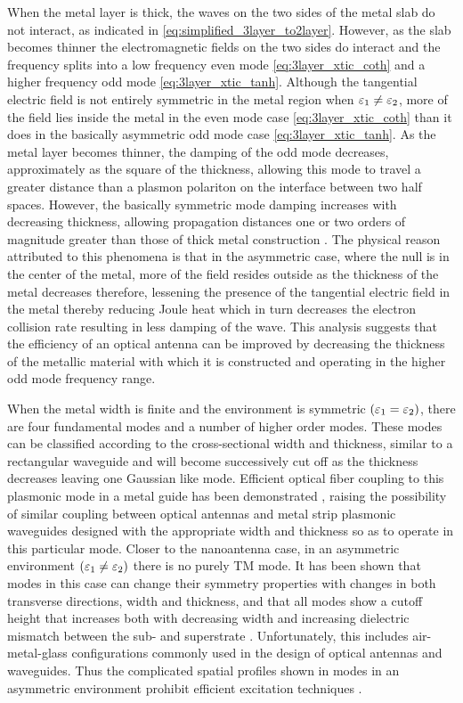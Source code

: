 When the metal layer is thick, the waves on the two sides of the metal slab do not interact, as indicated in \eqref{eq:simplified_3layer_to2layer}. However, as the slab becomes thinner the electromagnetic fields on the two sides do interact and the frequency splits into a low frequency even mode \eqref{eq:3layer_xtic_coth} and a higher frequency odd mode \eqref{eq:3layer_xtic_tanh}. Although the tangential electric field is not entirely symmetric in the metal region when $\varepsilon_1 \ne \varepsilon_2$, more of the field lies inside the metal in the even mode case \eqref{eq:3layer_xtic_coth} than it does in the basically asymmetric odd mode case \eqref{eq:3layer_xtic_tanh}. As the metal layer becomes thinner, the damping of the odd mode decreases, approximately as the square of the thickness, allowing this mode to travel a greater distance than a plasmon polariton on the interface between two half spaces. However, the basically symmetric mode damping increases with decreasing thickness, allowing propagation distances one or two orders of magnitude greater than those of thick metal construction
\cite{Sarid1981}. The physical reason attributed to this phenomena is that in the asymmetric case, where the null is in the center of the metal, more of the field resides outside as the thickness of the metal decreases therefore, lessening the presence of the tangential electric field in the metal thereby reducing Joule heat which in turn decreases the electron collision rate resulting in less damping of the wave. This analysis suggests that the efficiency of an optical antenna can be improved by decreasing the thickness of the metallic material with which it is constructed and operating in the higher odd mode frequency range.

When the metal width is finite and the environment is symmetric $(\varepsilon_1 = \varepsilon_2)$, there are four fundamental modes and a number of higher order modes. These modes can be classified according to the cross-sectional width and thickness, similar to a rectangular waveguide and will become successively cut off as the thickness decreases leaving one Gaussian like mode. Efficient optical fiber coupling to this plasmonic mode in a metal guide has been demonstrated \cite{Berini2000}, raising the possibility of similar coupling between optical antennas and metal strip plasmonic waveguides designed with the appropriate width and thickness so as to operate in this particular mode. Closer to the nanoantenna case, in an asymmetric environment $(\varepsilon_1 \ne \varepsilon_2)$ there is no purely TM mode. It has been shown that modes in this case can change their symmetry properties with changes in both transverse directions, width and thickness, and that all modes show a cutoff height that increases both with decreasing width and increasing dielectric mismatch
between the sub- and superstrate \cite{Berini2000,Berini2001}. Unfortunately, this includes air-metal-glass configurations commonly used in the design of optical antennas and waveguides. Thus the complicated spatial profiles shown in modes in an asymmetric environment prohibit efficient excitation techniques \cite{Maier2005,Yang1991}.

